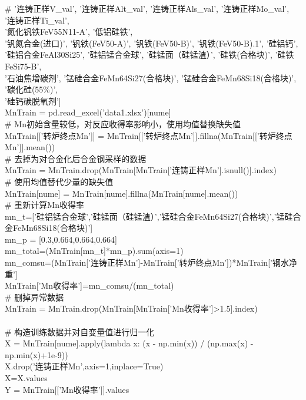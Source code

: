 \documentclass{xcumcmart}
\begin{document}
\#        '连铸正样V\_val', '连铸正样Alt\_val', '连铸正样Als\_val', '连铸正样Mo\_val', '连铸正样Ti\_val',  \\
        '氮化钒铁FeV55N11-A', '低铝硅铁',  \\
       '钒氮合金(进口)', '钒铁(FeV50-A)', '钒铁(FeV50-B)', '钒铁(FeV50-B).1', '硅铝钙',  \\
       '硅铝合金FeAl30Si25', '硅铝锰合金球', '硅锰面（硅锰渣）', '硅铁(合格块)', '硅铁FeSi75-B',  \\
       '石油焦增碳剂', '锰硅合金FeMn64Si27(合格块)', '锰硅合金FeMn68Si18(合格块)', '碳化硅(55\%)',  \\
       '硅钙碳脱氧剂']  \\
MnTrain = pd.read\_excel('data1.xlsx')[nume]  \\
\# Mn初始含量较低，对反应收得率影响小，使用均值替换缺失值  \\
MnTrain[['转炉终点Mn']] = MnTrain[['转炉终点Mn']].fillna(MnTrain[['转炉终点Mn']].mean())  \\
\# 去掉为对合金化后合金钢采样的数据  \\
MnTrain = MnTrain.drop(MnTrain[MnTrain['连铸正样Mn'].isnull()].index)  \\
\# 使用均值替代少量的缺失值  \\
MnTrain[nume] = MnTrain[nume].fillna(MnTrain[nume].mean())  \\
\# 重新计算Mn收得率  \\
mn\_t=['硅铝锰合金球','硅锰面（硅锰渣）','锰硅合金FeMn64Si27(合格块)','锰硅合金FeMn68Si18(合格块)']  \\
mn\_p = [0.3,0.664,0.664,0.664]  \\
mn\_total=(MnTrain[mn\_t]*mn\_p).sum(axis=1)  \\
mn\_comsu=(MnTrain['连铸正样Mn']-MnTrain['转炉终点Mn'])*MnTrain['钢水净重']  \\
MnTrain['Mn收得率']=mn\_comsu/(mn\_total)  \\
\# 删掉异常数据  \\
MnTrain = MnTrain.drop(MnTrain[MnTrain['Mn收得率']>1.5].index)  \\
\\
\# 构造训练数据并对自变量值进行归一化  \\
X = MnTrain[nume].apply(lambda x: (x - np.min(x)) / (np.max(x) - np.min(x)+1e-9))  \\
X.drop('连铸正样Mn',axis=1,inplace=True)  \\
X=X.values  \\
Y = MnTrain[['Mn收得率']].values  \\
\end{document}
